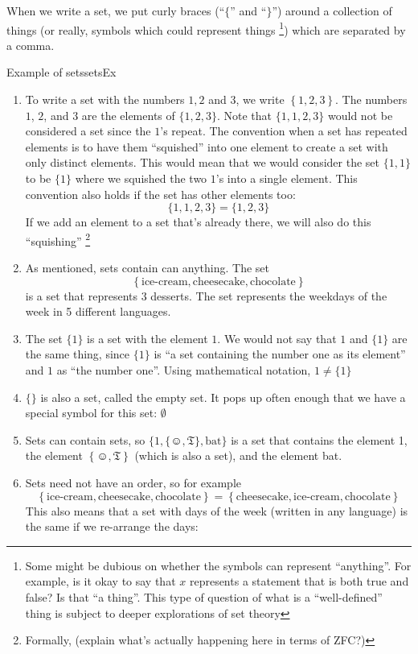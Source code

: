 \documentclass{book}
\begin{document}
When we write a set, we put curly braces (``$\{$'' and ``$\}$'') around a collection of things (or really, symbols
which could represent things \footnote{Some might be dubious on whether the symbols can represent ``anything''.
For example, is it okay to say that $x$ represents a statement that is both true and false? Is that ``a thing''. This
type of question of what is a ``well-defined'' thing is subject to deeper explorations of set theory}) which are separated by a comma.
\begin{example}{Example of sets}{setsEx}
	\begin{enumerate}
		\item To write a set with the numbers $1,2$ and $3$, we write $\left\{ 1,2,3 \right\}$. The numbers $1$, $2$,
			and $3$ are the elements of $\{1,2,3\}$. Note that $\{1,1,2,3\}$ would not be considered a set
			since the $1$'s repeat. The convention when a set has repeated elements is to have them
			``squished'' into one element to create a set with only distinct elements. This would mean that we would
			consider the set $\{1,1\}$ to be $\{1\}$ where we squished the two $1$'s into a single element. This
			convention also holds if the set has other elements too:
			\[
				\{1,1,2,3\} = \{1,2,3\}
			\]
			If we add an element to a set that's already there, we will also do this ``squishing'' \footnote{Formally,
			(explain what's actually happening here in terms of ZFC?)}

	\item As mentioned, sets contain can anything. The set
		\[
			\left\{ \text{ice-cream}, \text{cheesecake}, \text{chocolate} \right\}
		\]
		is a set that represents $3$ desserts. The set
		represents the weekdays of the week in 5 different languages.
	\item The set $\{1\}$ is a set with the element $1$. We would not say that $1$ and $\{1\}$ are the same thing, since
		$\{1\}$ is ``a set containing the number one as its element'' and $1$ as ``the number one''. Using mathematical
		notation, $1 \ne \{1\}$
	\item $\{\}$ is also a set, called the empty set. It pops up often enough that we have a special symbol for this
		set: $\emptyset$
	\item Sets can contain sets, so $\{1, \{\smiley, \mathfrak{T}\}, \text{bat}\}$ is a set that contains the element 1,
		the element $ \left\{ \smiley, \mathfrak{T} \right\}$ (which is also a set), and the element bat.
	\item Sets need not have an order, so for example
		\[
			\left\{ \text{ice-cream}, \text{cheesecake}, \text{chocolate} \right\} = \left\{ \text{cheesecake},
			\text{ice-cream}, \text{chocolate} \right\}
		\]
		This also means that a set with days of the week (written in any language) is the same if we re-arrange the days:
\end{enumerate}
\end{example}
\end{document}
